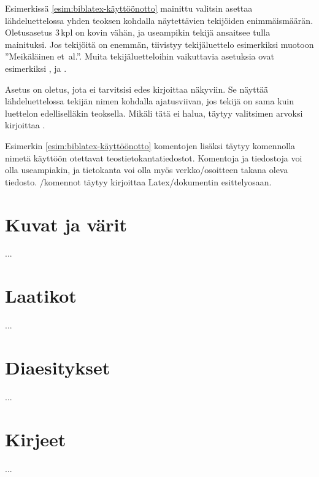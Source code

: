 Esimerkissä \ref{esim:biblatex-käyttöönotto} mainittu valitsin
 asettaa lähdeluettelossa yhden teoksen kohdalla
näytettävien tekijöiden enimmäismäärän. Oletusasetus 3\,kpl on kovin
vähän, ja useampikin tekijä ansaitsee tulla mainituksi. Jos tekijöitä on
enemmän, tiivistyy tekijäluettelo esimerkiksi muotoon ''Meikäläinen
et~al.''. Muita tekijäluetteloihin vaikuttavia asetuksia ovat
esimerkiksi ,  ja
.

Asetus  on oletus, jota ei tarvitsisi edes kirjoittaa
näkyviin. Se näyttää lähdeluettelossa tekijän nimen kohdalla
ajatusviivan, jos tekijä on sama kuin luettelon edelliselläkin
teoksella. Mikäli tätä ei halua, täytyy valitsimen arvoksi kirjoittaa
.

Esimerkin \ref{esim:biblatex-käyttöönotto} komentojen lisäksi täytyy
komennolla  nimetä käyttöön otettavat
teostietokantatiedostot. Komentoja ja tiedostoja voi olla useampiakin,
ja tietokanta voi olla myös verkko\-/osoitteen takana oleva tiedosto.
\-/komennot täytyy kirjoittaa
Latex\-/dokumentin esittelyosaan.

\begin{koodilohkosis}
  
  
  
\end{koodilohkosis}

\section{Kuvat ja värit}
\label{luku:grafiikka}

...

\section{Laatikot}

...

\section{Diaesitykset}
\label{luku:diaesitykset}

...

\section{Kirjeet}
\label{luku:kirjeet}

...
